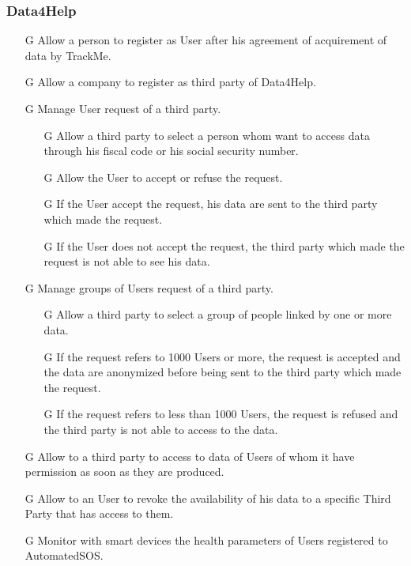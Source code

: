\documentclass[../../rasd.tex]{subfiles}
\begin{document}
				\subsubsection{Data4Help}
					\begin{itemize}
						\item[G\subs{1}]Allow a person to register as User after his agreement of acquirement of data by TrackMe.
						\item[G\subs{2}]Allow a company to register as third party of Data4Help.
						\item[G\subs{3}]Manage User request of a third party.
							\begin{itemize}
								\item [G\subs{3.1}]Allow a third party to select a person whom want to access data through his fiscal code or his social security number.
								\item [G\subs{3.2}]Allow the User to accept or refuse the request.
								\item [G\subs{3.3}]If the User accept the request, his data are sent to the third party which made the request.
								\item [G\subs{3.4}]If the User does not accept the request, the third party which made the request is not able to see his data.
							\end{itemize}	
						\item [G\subs{4}]Manage groups of Users request of a third party.
							\begin{itemize}
								\item [G\subs{4.1}]Allow a third party to select a group of people linked by one or more data.
								\item [G\subs{4.2}]If the request refers to 1000 Users or more, the request is accepted and the data are anonymized before being sent to the third party which made the request.
								\item [G\subs{4.3}]If the request refers to less than 1000 Users, the request is refused and the third party is not able to access to the data.
							\end{itemize}								
						\item[G\subs{5}]Allow to a third party to access to data of Users of whom it have permission as soon as they are produced.
						\item[G\subs{6}]Allow to an User to revoke the availability of his data to a specific Third Party that has access to them.	
						\item[G\subs{7}]Monitor with smart devices the health parameters of Users registered to AutomatedSOS.
					\end{itemize}
\end{document}
